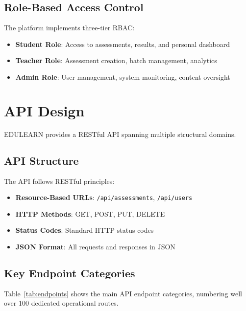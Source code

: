 \documentclass[conference]{IEEEtran}
\begin{document}
\subsection{Role-Based Access Control}
The platform implements three-tier RBAC:
\begin{itemize}
    \item \textbf{Student Role}: Access to assessments, results, and personal dashboard
    \item \textbf{Teacher Role}: Assessment creation, batch management, analytics
    \item \textbf{Admin Role}: User management, system monitoring, content oversight
\end{itemize}

\section{API Design}
EDULEARN provides a RESTful API spanning multiple structural domains.

\subsection{API Structure}
The API follows RESTful principles:
\begin{itemize}
    \item \textbf{Resource-Based URLs}: \texttt{/api/assessments}, \texttt{/api/users}
    \item \textbf{HTTP Methods}: GET, POST, PUT, DELETE
    \item \textbf{Status Codes}: Standard HTTP status codes
    \item \textbf{JSON Format}: All requests and responses in JSON
\end{itemize}

\subsection{Key Endpoint Categories}
Table~\ref{tab:endpoints} shows the main API endpoint categories, numbering well over 100 dedicated operational routes.
\end{document}
